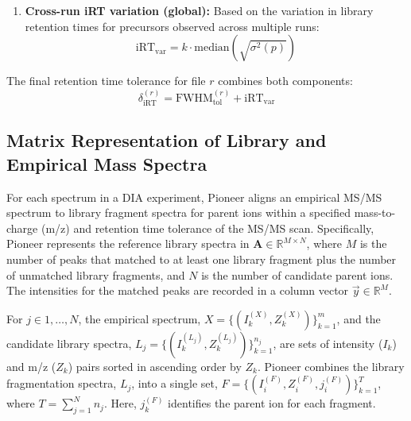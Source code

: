 \documentclass[pdflatex,sn-nature]{sn-jnl}
\begin{document}
\begin{enumerate}
{\begin{enumerate}
    \item \textbf{Cross-run iRT variation (global):} Based on the variation in library retention times for precursors observed across multiple runs:
    \begin{equation}
        \text{iRT}_{\text{var}} = k \cdot \text{median} \left(\sqrt{\sigma^2(p)}\right)
        \label{eq:irt_var}
    \end{equation}
\end{enumerate}
The final retention time tolerance for file $r$ combines both components:
\begin{equation}
    \delta_{\text{iRT}}^{(r)} = \text{FWHM}_{\text{tol}}^{(r)} + \text{iRT}_{\text{var}}
\end{equation}
}
\end{enumerate}





\subsection{Matrix Representation of Library and Empirical Mass Spectra}\label{subsec2}

For each spectrum in a DIA experiment, Pioneer aligns an empirical MS/MS spectrum to library fragment spectra for parent ions within a specified mass-to-charge (m/z) and retention time tolerance of the MS/MS scan. Specifically, Pioneer represents the reference library spectra in $\mathbf{A} \in \mathbb{R}^{M \times N}$,  where $M$ is the number of peaks that matched to at least one library fragment plus the number of unmatched library fragments, and $N$ is the number of candidate parent ions. The intensities for the matched peaks are recorded in a column vector $\vec{y} \in \mathbb{R}^{M}$.

For $j \in {1,\ldots,N}$, the empirical spectrum, $X = \{(I_k^{(X)},Z_k^{(X)})\}_{k=1}^m$, and the candidate library spectra, $L_j = \{(I_k^{(L_j)}, Z_k^{(L_j)})\}_{k=1}^{n_j}$, are sets of intensity ($I_k$) and m/z ($Z_k$) pairs sorted in ascending order by $Z_k$. Pioneer combines the library fragmentation spectra, $L_j$, into a single set, $F = \{(I_i^{(F)}, Z_i^{(F)}, j_i^{(F)})\}_{k=1}^{T}$, where $T = \sum_{j=1}^{N}n_j$. Here, $j_k^{(F)}$ identifies the parent ion for each fragment.
\end{document}
